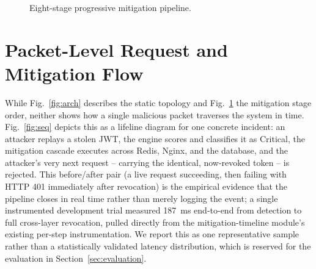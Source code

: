 \documentclass[conference]{IEEEtran}
\begin{document}
\begin{figure}[!htbp]
\caption{Eight-stage progressive mitigation pipeline.}
\label{fig:mitigation}
\end{figure}

\section{Packet-Level Request and Mitigation Flow}
While Fig.~\ref{fig:arch} describes the static topology and Fig.~\ref{fig:mitigation} the mitigation stage order, neither shows how a single malicious packet traverses the system in time. Fig.~\ref{fig:seq} depicts this as a lifeline diagram for one concrete incident: an attacker replays a stolen JWT, the engine scores and classifies it as Critical, the mitigation cascade executes across Redis, Nginx, and the database, and the attacker's very next request -- carrying the identical, now-revoked token -- is rejected. This before/after pair (a live request succeeding, then failing with HTTP 401 immediately after revocation) is the empirical evidence that the pipeline closes in real time rather than merely logging the event; a single instrumented development trial measured 187~ms end-to-end from detection to full cross-layer revocation, pulled directly from the mitigation-timeline module's existing per-step instrumentation. We report this as one representative sample rather than a statistically validated latency distribution, which is reserved for the evaluation in Section~\ref{sec:evaluation}.
\end{document}
